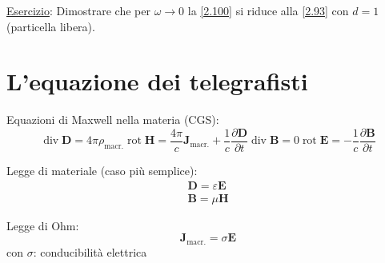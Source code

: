 \documentclass[a4paper,11pt]{report}
\newcommand{\vect}[1]{\boldsymbol{#1}}
\begin{document}
\medskip

\underline{Esercizio}: Dimostrare che per $\omega \to 0$ la \eqref{2.100} si riduce alla \eqref{2.93} con $d=1$ (particella libera).

\section{L'equazione dei telegrafisti}

Equazioni di Maxwell nella materia (CGS):
\begin{subequations}
\begin{equation}
\operatorname{div} \vect{D} = 4\pi \rho_\text{macr.}
\label{2.101a}
\end{equation}
\begin{equation}
\operatorname{rot} \vect{H}=\frac{4\pi}{c}\vect{J}_\text{macr.} + \frac{1}{c}\frac{\partial \vect{D}}{\partial t}
\label{2.101b}
\end{equation}
\begin{equation}
\operatorname{div} \vect{B}=0 
\label{2.101c}
\end{equation}
\begin{equation}
\operatorname{rot} \vect{E}=-\frac{1}{c}\frac{\partial \vect{B}}{\partial t}
\label{2.101d}
\end{equation}
\end{subequations}

Legge di materiale (caso pi\`u semplice):
\begin{equation}
\begin{gathered}
\vect{D} = \varepsilon \vect{E} \\
\vect{B} = \mu \vect{H}
\end{gathered}
\label{2.102}
\end{equation}

Legge di Ohm:
\begin{equation}
\vect{J}_\text{macr.} = \sigma \vect{E}
\label{2.103}
\end{equation}
con $\sigma$: conducibilit\`a elettrica
\end{document}
